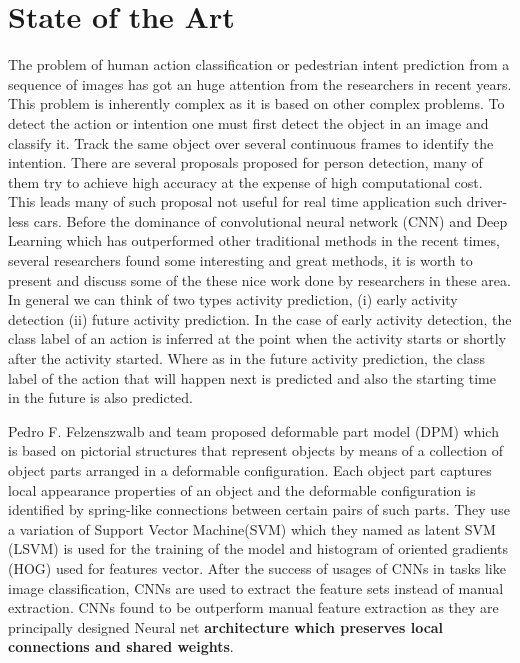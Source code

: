 \chapter{State of the Art}
The problem of human action classification or pedestrian intent prediction from a sequence of images has got an huge attention from the researchers in recent years. 
This problem is inherently complex as it is based on other 
complex problems. To detect the action or intention one must first detect the object in an image and classify it. Track the same object over several continuous frames to identify the intention. There are several proposals proposed for person detection, many of them try to achieve high accuracy at the expense of high computational cost. This leads many of such proposal not useful for real time application such driver-less cars.   
Before the dominance of convolutional neural network (CNN) and Deep Learning which has outperformed other traditional methods in the recent times, several researchers found some interesting and great methods, it is worth to present and discuss some of the these nice work done by researchers in these area. In general we can think of two types activity prediction, (i) early activity detection (ii) future activity prediction. In the case of early activity detection, the class label of an action is inferred at the point when the activity starts or shortly after the activity started. Where as in the future activity prediction, the class label of the action that will happen next is predicted and also the starting time in the future is also predicted.
 

\newpara
Pedro F. Felzenszwalb and team proposed deformable part model (DPM) \cite{felzenszwalb2009object} which is based on pictorial structures that represent objects by means of a collection of object parts arranged in a deformable configuration. Each object part captures local appearance properties of
an object and the deformable configuration is identified  by spring-like connections between certain pairs of such parts. They use a variation of Support Vector Machine(SVM) which they named as latent SVM (LSVM) is used for the training of the model and  histogram of oriented gradients (HOG) used for features vector. After the success of usages of CNNs in tasks like image classification, CNNs are used to extract the feature sets instead of manual extraction. CNNs found to be outperform manual feature extraction as they are principally designed Neural net \textbf{architecture which preserves local connections and shared weights}.

